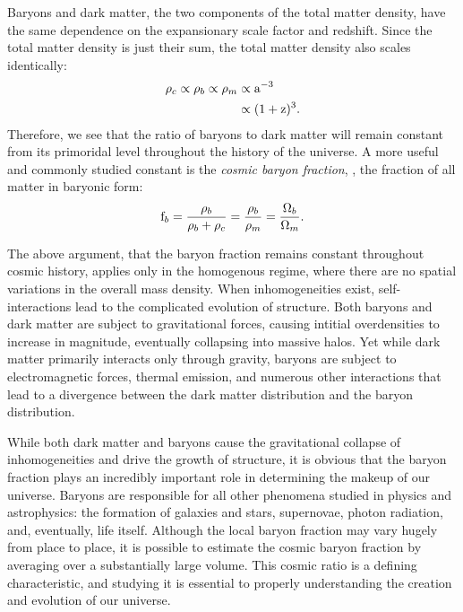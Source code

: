 Baryons and dark matter, the two components of the total matter
density, have the same dependence on the expansionary scale factor
and redshift. Since the total matter density is just their sum, the
total matter density also scales identically:
\begin{align}
\rho_c \propto \rho_b \propto \rho_m & \propto \textrm{a}^{-3} \nonumber \\
& \propto (1+\textrm{z})^{3}. \nonumber
\end{align}
Therefore, we see that the ratio of baryons to dark matter will remain
constant from its primoridal level throughout the history of the
universe. A more useful and commonly studied constant is the
\textit{cosmic baryon fraction}, \fb, the fraction of all matter in
baryonic form:
\begin{equation}
\textrm{f\ensuremath{_b}} = \frac{\rho_b}{\rho_b + \rho_c} = \frac{\rho_b}{\rho_m} =
\frac{\Omega_b}{\Omega_m}.
\end{equation}

The above argument, that the baryon fraction remains constant
throughout cosmic history, applies only in the homogenous regime,
where there are no spatial variations in the overall mass
density. When inhomogeneities exist, self-interactions lead to the
complicated evolution of structure. Both baryons and dark matter are
subject to gravitational forces, causing intitial overdensities to
increase in magnitude, eventually collapsing into massive halos. Yet
while dark matter primarily interacts only through gravity, baryons
are subject to electromagnetic forces, thermal emission, and numerous
other interactions that lead to a divergence between the dark matter
distribution and the baryon distribution.

While both dark matter and baryons cause the gravitational collapse of
inhomogeneities and drive the growth of structure, it is obvious that
the baryon fraction plays an incredibly important role in determining
the makeup of our universe. Baryons are responsible for all other
phenomena studied in physics and astrophysics: the formation of
galaxies and stars, supernovae, photon radiation, and, eventually,
life itself. Although the local baryon fraction may vary hugely from
place to place, it is possible to estimate the cosmic baryon fraction
by averaging over a substantially large volume. This cosmic ratio is
a defining characteristic, and studying it is essential to properly
understanding the creation and evolution of our universe. 


